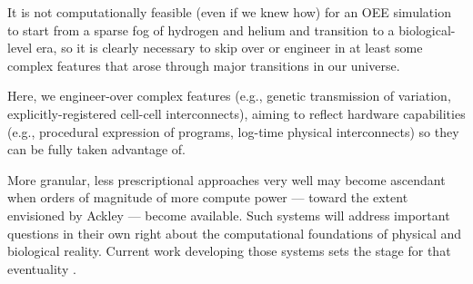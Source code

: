 \begin{displayquote}
It is not computationally feasible (even if we knew how) for an OEE simulation to start from a sparse fog of hydrogen and helium and transition to a biological-level era, so it is clearly necessary to skip over or engineer in at least some complex features that arose through major transitions in our universe.
\end{displayquote}

Here, we engineer-over complex features (e.g., genetic transmission of variation, explicitly-registered cell-cell interconnects), aiming to reflect hardware capabilities (e.g., procedural expression of programs, log-time physical interconnects) so they can be fully taken advantage of.

More granular, less prescriptional approaches very well may become ascendant when orders of magnitude of more compute power --- toward the extent envisioned by Ackley --- become available.
Such systems will address important questions in their own right about the computational foundations of physical and biological reality.
Current work developing those systems sets the stage for that eventuality \citep{ackley2018alife}.
